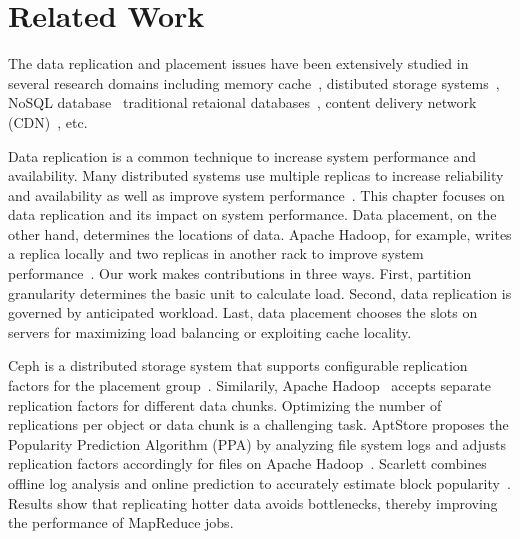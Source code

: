 % 
\section{Related Work}
\label{sec:related}

The data replication and placement issues have been extensively studied
in several research domains
including memory cache~\cite{Leff1993,Zaman2011},
distibuted storage systems~\cite{Lim2010},
NoSQL database~\cite{Rodrigues2013,Cruz2013,Corbett2013}
traditional retaional databases~\cite{Pavlo2012,Curino2010},
content delivery network (CDN)~\cite{Laoutaris2006}, etc.

Data replication is a common technique to increase
system performance and availability.
Many distributed systems use multiple replicas to
increase reliability and availability as well as improve system
performance~\cite{hbase,SageWeil2006Ceph}.
This chapter focuses on data replication and
its impact on system performance.
Data placement, on the other hand, determines the locations of data.
Apache Hadoop, for example, writes a replica locally and
two replicas in another rack to improve
system performance~\cite{Xie2010,Eltabakh2011}.
Our work makes contributions in three ways.
First, partition granularity determines the basic unit to calculate load.
Second, data replication is governed by anticipated workload.
Last, data placement chooses the slots on servers for maximizing
load balancing or exploiting cache locality.

Ceph is a distributed storage system
that supports configurable replication factors
for the placement group~\cite{SageWeil2006Ceph}.
Similarily, Apache Hadoop~\cite{hadoop} accepts separate replication factors
for different data chunks.
Optimizing the number of replications per object or data chunk
is a challenging task.
AptStore proposes the Popularity Prediction Algorithm (PPA) by
analyzing file system logs and adjusts replication factors accordingly
for files on Apache Hadoop~\cite{Krish2013}.
Scarlett combines offline log analysis and online prediction to
accurately estimate block popularity~\cite{Ananthanarayanan2011}.
Results show that replicating hotter data avoids bottlenecks,
thereby improving the performance of MapReduce jobs.

